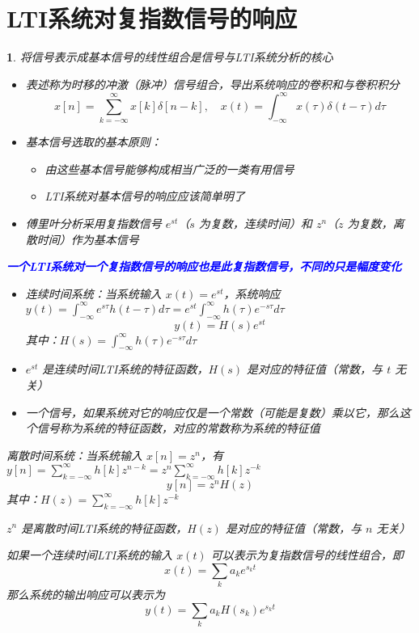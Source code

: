 \documentclass[UTF8]{report}
\theoremstyle{MyLineTheoremStyle} %
\theoremstyle{MyBlockTheoremStyle} %
\theoremstyle{MySubsubsectionStyle} %
\newtheorem{definition}{}
\begin{document}
\section{LTI系统对复指数信号的响应}

\begin{definition}
    将信号表示成基本信号的线性组合是信号与LTI系统分析的核心
    \begin{itemize}
        \item 表述称为时移的冲激（脉冲）信号组合，导出系统响应的卷积和与卷积积分
        \[
        x[n] = \sum_{k=-\infty}^{\infty} x[k] \delta[n - k], \quad x(t) = \int_{-\infty}^{\infty} x(\tau) \delta(t - \tau) d\tau
        \]
        \item 基本信号选取的基本原则：
        \begin{itemize}
            \item 由这些基本信号能够构成相当广泛的一类有用信号
            \item LTI系统对基本信号的响应应该简单明了
        \end{itemize}
        \item 傅里叶分析采用复指数信号 $e^{st}$（$s$ 为复数，连续时间）和 $z^n$（$z$ 为复数，离散时间）作为基本信号
    \end{itemize}

    \textbf{\textcolor{blue}{一个LTI系统对一个复指数信号的响应也是此复指数信号，不同的只是幅度变化}}
    \begin{itemize}
        \item 连续时间系统：当系统输入 $x(t) = e^{st}$，系统响应 $y(t) = \int_{-\infty}^{\infty} e^{s\tau} h(t - \tau) d\tau = e^{st} \int_{-\infty}^{\infty} h(\tau) e^{-s\tau} d\tau$
        \[
        y(t) = H(s) e^{st}
        \]
        其中：$H(s) = \int_{-\infty}^{\infty} h(\tau) e^{-s\tau} d\tau$
        \item $e^{st}$ 是连续时间LTI系统的特征函数，$H(s)$ 是对应的特征值（常数，与 $t$ 无关）
        \item 一个信号，如果系统对它的响应仅是一个常数（可能是复数）乘以它，那么这个信号称为系统的特征函数，对应的常数称为系统的特征值
    \end{itemize}

    离散时间系统：当系统输入 $x[n] = z^n$，有 $y[n] = \sum_{k=-\infty}^{\infty} h[k] z^{n-k} = z^n \sum_{k=-\infty}^{\infty} h[k] z^{-k}$
    \[
    y[n] = z^n H(z)
    \]
    其中：$H(z) = \sum_{k=-\infty}^{\infty} h[k] z^{-k}$
    \item $z^n$ 是离散时间LTI系统的特征函数，$H(z)$ 是对应的特征值（常数，与 $n$ 无关）\par
\vspace{2em}
    如果一个连续时间LTI系统的输入 $x(t)$ 可以表示为复指数信号的线性组合，即 
    \[
    x(t) = \sum_{k} a_k e^{s_k t}
    \]
    那么系统的输出响应可以表示为
    \[
    y(t) = \sum_{k} a_k H(s_k) e^{s_k t}
    \]


\end{definition}
\end{document}

